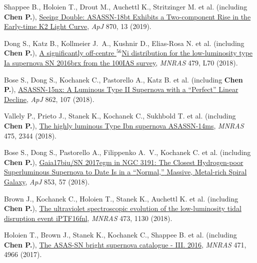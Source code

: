 \item Shappee B., Holoien T., Drout M., Auchettl K., Stritzinger M. et al. (including \textbf{Chen P.}), \href{https://ui.adsabs.harvard.edu/abs/2019ApJ...870...13S}{Seeing Double: ASASSN-18bt Exhibits a Two-component Rise in the Early-time K2 Light Curve}, \textit{ApJ} 870, 13 (2019).

\item Dong S., Katz B., Kollmeier J.~A., Kushnir D., Elias-Rosa N. et al. (including \textbf{Chen P.}), \href{https://ui.adsabs.harvard.edu/abs/2018MNRAS.479L..70D}{A significantly off-centre $^{56}$Ni distribution for the low-luminosity type Ia supernova SN 2016brx from the 100IAS survey}, \textit{MNRAS} 479, L70 (2018).

\item Bose S., Dong S., Kochanek C., Pastorello A., Katz B. et al. (including \textbf{Chen P.}), \href{https://ui.adsabs.harvard.edu/abs/2018ApJ...862..107B}{ASASSN-15nx: A Luminous Type II Supernova with a {\textquotedblleft}Perfect{\textquotedblright} Linear Decline}, \textit{ApJ} 862, 107 (2018).

\item Vallely P., Prieto J., Stanek K., Kochanek C., Sukhbold T. et al. (including \textbf{Chen P.}), \href{https://ui.adsabs.harvard.edu/abs/2018MNRAS.475.2344V}{The highly luminous Type Ibn supernova ASASSN-14ms}, \textit{MNRAS} 475, 2344 (2018).

\item Bose S., Dong S., Pastorello A., Filippenko A.~V., Kochanek C. et al. (including \textbf{Chen P.}), \href{https://ui.adsabs.harvard.edu/abs/2018ApJ...853...57B}{Gaia17biu/SN 2017egm in NGC 3191: The Closest Hydrogen-poor Superluminous Supernova to Date Is in a {\textquotedblleft}Normal,{\textquotedblright} Massive, Metal-rich Spiral Galaxy}, \textit{ApJ} 853, 57 (2018).

\item Brown J., Kochanek C., Holoien T., Stanek K., Auchettl K. et al. (including \textbf{Chen P.}), \href{https://ui.adsabs.harvard.edu/abs/2018MNRAS.473.1130B}{The ultraviolet spectroscopic evolution of the low-luminosity tidal disruption event iPTF16fnl}, \textit{MNRAS} 473, 1130 (2018).

\item Holoien T., Brown J., Stanek K., Kochanek C., Shappee B. et al. (including \textbf{Chen P.}), \href{https://ui.adsabs.harvard.edu/abs/2017MNRAS.471.4966H}{The ASAS-SN bright supernova catalogue - III. 2016}, \textit{MNRAS} 471, 4966 (2017).

